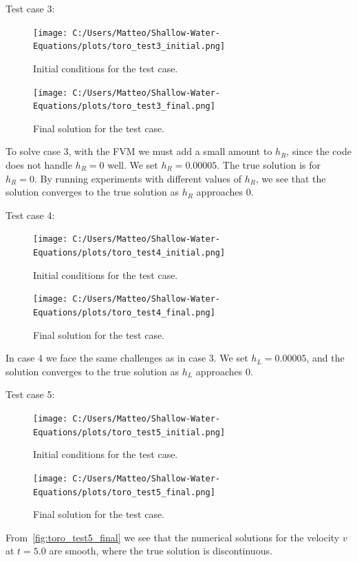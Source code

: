 Test case 3:
\begin{figure}[H]
    \centering
    \texttt{[image: C:/Users/Matteo/Shallow-Water-Equations/plots/toro\_test3\_initial.png]}
    \caption{Initial conditions for the test case.}\label{fig:toro_test3_initial}
\end{figure}

\begin{figure}[H]
    \centering
    \texttt{[image: C:/Users/Matteo/Shallow-Water-Equations/plots/toro\_test3\_final.png]}
    \caption{Final solution for the test case.}\label{fig:toro_test3_final}
\end{figure}
To solve case 3, with the FVM we must add a small amount to $h_R$, since the code does not handle $h_R = 0$ well.
We set $h_R = 0.00005$.
The true solution is for $h_R = 0$.
By running experiments with different values of $h_R$, we see that the solution converges to the true solution as $h_R$ approaches 0.


Test case 4:
\begin{figure}[H]
    \centering
    \texttt{[image: C:/Users/Matteo/Shallow-Water-Equations/plots/toro\_test4\_initial.png]}
    \caption{Initial conditions for the test case.}\label{fig:toro_test4_initial}
\end{figure}

\begin{figure}[H]
    \centering
    \texttt{[image: C:/Users/Matteo/Shallow-Water-Equations/plots/toro\_test4\_final.png]}
    \caption{Final solution for the test case.}\label{fig:toro_test4_final}
\end{figure}
In case 4 we face the same challenges as in case 3.
We set $h_L = 0.00005$, and the solution converges to the true solution as $h_L$ approaches 0.



Test case 5:
\begin{figure}[H]
    \centering
    \texttt{[image: C:/Users/Matteo/Shallow-Water-Equations/plots/toro\_test5\_initial.png]}
    \caption{Initial conditions for the test case.}\label{fig:toro_test5_initial}
\end{figure}

\begin{figure}[H]
    \centering
    \texttt{[image: C:/Users/Matteo/Shallow-Water-Equations/plots/toro\_test5\_final.png]}
    \caption{Final solution for the test case.}\label{fig:toro_test5_final}
\end{figure}
From~\autoref{fig:toro_test5_final} we see that the numerical solutions for the velocity $v$ at $t=5.0$ are smooth, where the true solution is discontinuous. 



